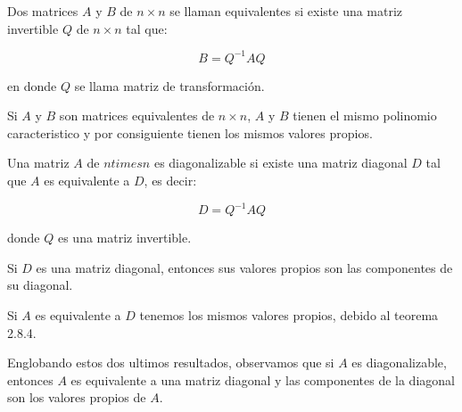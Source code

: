 		\begin{definicion}
			Dos matrices $A$ y $B$ de $n \times n$ se llaman equivalentes si existe una matriz invertible $Q$ de $n \times n$ tal que:

			\begin{equation}
				B = Q^{-1} A Q
			\end{equation}

			en donde $Q$ se llama matriz de transformación.
		\end{definicion}

		\begin{teorema}
			Si $A$ y $B$ son matrices equivalentes de $n \times n$, $A$ y $B$ tienen el mismo polinomio caracteristico y por consiguiente tienen los mismos valores propios.
		\end{teorema}

		\begin{definicion}
			Una matriz $A$ de $n times n$ es diagonalizable si existe una matriz diagonal $D$ tal que $A$ es equivalente a $D$, es decir:

			\begin{equation}
				D = Q^{-1} A Q
			\end{equation}

			donde $Q$ es una matriz invertible.
		\end{definicion}

		\begin{observacion}
			Si $D$ es una matriz diagonal, entonces sus valores propios son las componentes de su diagonal.
		\end{observacion}

		\begin{observacion}
			Si $A$ es equivalente a $D$ tenemos los mismos valores propios, debido al teorema 2.8.4.
		\end{observacion}

		\begin{observacion}
			Englobando estos dos ultimos resultados, observamos que si $A$ es diagonalizable, entonces $A$ es equivalente a una matriz diagonal y las componentes de la diagonal son los valores propios de $A$.
		\end{observacion}

